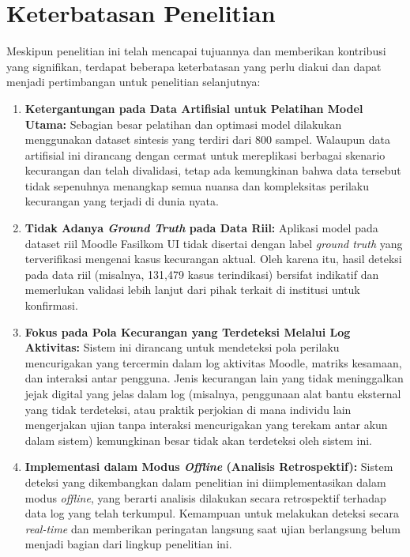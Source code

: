 \section{Keterbatasan Penelitian}
\label{sec:keterbatasan_penelitian_bab5}
Meskipun penelitian ini telah mencapai tujuannya dan memberikan kontribusi yang signifikan, terdapat beberapa keterbatasan yang perlu diakui dan dapat menjadi pertimbangan untuk penelitian selanjutnya:
\begin{enumerate}
\item \textbf{Ketergantungan pada Data Artifisial untuk Pelatihan Model Utama:} Sebagian besar pelatihan dan optimasi model dilakukan menggunakan dataset sintesis yang terdiri dari 800 sampel. Walaupun data artifisial ini dirancang dengan cermat untuk mereplikasi berbagai skenario kecurangan dan telah divalidasi, tetap ada kemungkinan bahwa data tersebut tidak sepenuhnya menangkap semua nuansa dan kompleksitas perilaku kecurangan yang terjadi di dunia nyata.
\item \textbf{Tidak Adanya \textit{Ground Truth} pada Data Riil:} Aplikasi model pada dataset riil Moodle Fasilkom UI tidak disertai dengan label \textit{ground truth} yang terverifikasi mengenai kasus kecurangan aktual. Oleh karena itu, hasil deteksi pada data riil (misalnya, 131,479 kasus terindikasi) bersifat indikatif dan memerlukan validasi lebih lanjut dari pihak terkait di institusi untuk konfirmasi.
\item \textbf{Fokus pada Pola Kecurangan yang Terdeteksi Melalui Log Aktivitas:} Sistem ini dirancang untuk mendeteksi pola perilaku mencurigakan yang tercermin dalam log aktivitas Moodle, matriks kesamaan, dan interaksi antar pengguna. Jenis kecurangan lain yang tidak meninggalkan jejak digital yang jelas dalam log (misalnya, penggunaan alat bantu eksternal yang tidak terdeteksi, atau praktik perjokian di mana individu lain mengerjakan ujian tanpa interaksi mencurigakan yang terekam antar akun dalam sistem) kemungkinan besar tidak akan terdeteksi oleh sistem ini.
\item \textbf{Implementasi dalam Modus \textit{Offline} (Analisis Retrospektif):} Sistem deteksi yang dikembangkan dalam penelitian ini diimplementasikan dalam modus \textit{offline}, yang berarti analisis dilakukan secara retrospektif terhadap data log yang telah terkumpul. Kemampuan untuk melakukan deteksi secara \textit{real-time} dan memberikan peringatan langsung saat ujian berlangsung belum menjadi bagian dari lingkup penelitian ini.

\end{enumerate}
